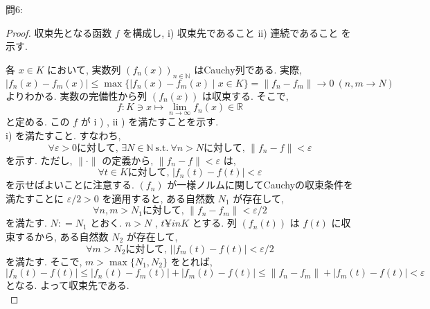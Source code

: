 \documentclass[dvipdfmx,uplatex,11pt]{jsarticle}
\begin{document}
問6:\\
\dotfill
\begin{leftbar}
	\begin{proof}
	収束先となる函数 $f$ を構成し, i) 収束先であること ii) 連続であること  を示す. 
	
	各 $x \in K$ において, 実数列 $( f_n ( x ) ) _ {n \in \mathbb N}$ はCauchy列である. 実際, 
%		
		\[
			| f _n ( x ) - f _m ( x ) | \leq \max \{ | f_n ( x ) - f_m ( x ) \mid x \in K \} = \| f_n - f_m \| \to 0 \ ( n , m \to N )
		\]
%		
	よりわかる. 実数の完備性から列 $( f_n ( x ) )$ は収束する. そこで, 
%		
		\[
			f : K \ni x \mapsto \lim_{n \to \infty} f_n ( x ) \in \mathbb R
		\]
%		
	と定める. この $f$ が i ) , ii ) を満たすことを示す. \\
	i) を満たすこと. すなわち, 
%		
		\[
			\forall \varepsilon > 0 \text {に対して, } \exists N \in \mathbb N \ \mathrm{s.t.} \ \forall n > N \text {に対して, } \| f_n - f \| < \varepsilon
		\]
%
	を示す. ただし, $\| \cdot \|$ の定義から, $\| f_n - f \| < \varepsilon$ は, 
%		
		\[
			\forall t \in K \text {に対して, } | f_n ( t ) - f ( t ) | < \varepsilon
		\]
%		
	を示せばよいことに注意する. $( f_n )$ が一様ノルムに関してCauchyの収束条件を満たすことに $\varepsilon / 2 > 0$ を適用すると, ある自然数 $N_1$ が存在して, 
%		
		\[
			\forall n , m > N _1 \text {に対して, } \| f_n - f_m \| < \varepsilon / 2
		\]
%		
	を満たす. $N : = N_1$ とおく. $n > N$ , $t ¥in K$ とする. 列 $( f_n ( t ) )$ は $f (t)$ に収束するから, ある自然数 $N_2$ が存在して, 
%		
		\[
			\forall m > N_2 \text {に対して, }| | f_{m} ( t ) - f ( t ) | < \varepsilon / 2
		\] 
%		
	を満たす. そこで, $m > \max \{ N_1 , N_2 \}$ をとれば, 
%		
		\[
			| f_n ( t ) - f ( t ) | \leq | f_n ( t ) - f_m ( t ) | + | f _m ( t ) - f ( t ) | \leq \| f_n - f_m \| + | f_m ( t ) - f ( t ) | < \varepsilon
		\] 
%		
	となる. よって収束先である. \\
	

\end{proof}
\end{leftbar}
\end{document}

